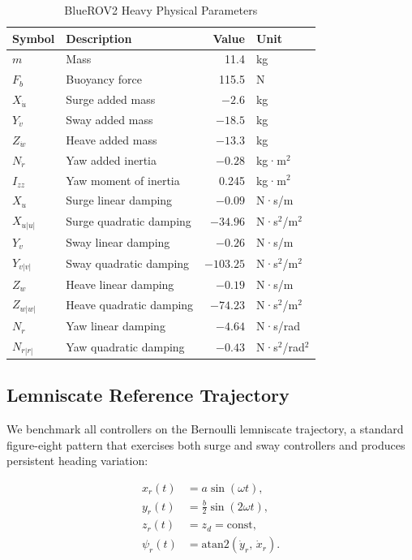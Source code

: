 \documentclass[journal]{IEEEtran}
\begin{document}
\begin{table}[htbp]
\centering
\caption{BlueROV2 Heavy Physical Parameters}
\label{tab:bluerov_params}
\begin{tabular}{llrl}
\toprule
Symbol & Description & Value & Unit \\
\midrule
$m$            & Mass                        & 11.4   & kg \\
$F_b$          & Buoyancy force              & 115.5  & N  \\
$X_{\dot{u}}$  & Surge added mass            & $-2.6$   & kg \\
$Y_{\dot{v}}$  & Sway added mass             & $-18.5$  & kg \\
$Z_{\dot{w}}$  & Heave added mass            & $-13.3$  & kg \\
$N_{\dot{r}}$  & Yaw added inertia           & $-0.28$  & kg·m$^2$ \\
$I_{zz}$       & Yaw moment of inertia       & 0.245  & kg·m$^2$ \\
$X_u$          & Surge linear damping        & $-0.09$  & N·s/m \\
$X_{u|u|}$     & Surge quadratic damping     & $-34.96$ & N·s$^2$/m$^2$ \\
$Y_v$          & Sway linear damping         & $-0.26$  & N·s/m \\
$Y_{v|v|}$     & Sway quadratic damping      & $-103.25$& N·s$^2$/m$^2$ \\
$Z_w$          & Heave linear damping        & $-0.19$  & N·s/m \\
$Z_{w|w|}$     & Heave quadratic damping     & $-74.23$ & N·s$^2$/m$^2$ \\
$N_r$          & Yaw linear damping          & $-4.64$  & N·s/rad \\
$N_{r|r|}$     & Yaw quadratic damping       & $-0.43$  & N·s$^2$/rad$^2$ \\
\bottomrule
\end{tabular}
\end{table}

\subsection{Lemniscate Reference Trajectory}

We benchmark all controllers on the Bernoulli lemniscate trajectory, a
standard figure-eight pattern that exercises both surge and sway controllers
and produces persistent heading variation:

\begin{align}
  x_r(t) &= a\sin(\omega t), \\
  y_r(t) &= \tfrac{b}{2}\sin(2\omega t), \\
  z_r(t) &= z_d = \text{const}, \\
  \psi_r(t) &= \mathrm{atan2}\!\left(\dot{y}_r,\, \dot{x}_r\right).
  \label{eq:lemniscate}
\end{align}
\end{document}
